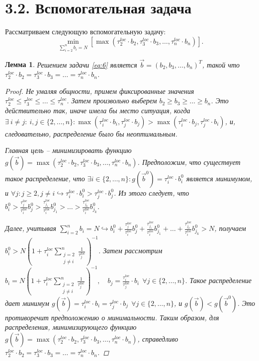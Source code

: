 \documentclass{article}
\theoremstyle{definition}
\theoremstyle{plain}
\newtheorem{lemma}{Лемма}
\begin{document}
\section*{3.2. Вспомогательная задача}
Рассматриваем следующую вспомогательную задачу:
\begin{equation}
    \label{eq:6}
    \underset{\sum\limits_{i = 2}^{n} b_i = N}{\min} [\max(\tau_2^{loc}\cdot b_2, \tau_3^{loc}\cdot b_3, \ldots, \tau_n^{loc}\cdot b_n)].
\end{equation}


\begin{lemma}
    \label{l1}
    Решением задачи \eqref{eq:6} является $\overrightarrow{b} = (b_2, b_3, \ldots, b_n)^{T}$, такой что $\tau_2^{loc}\cdot b_2 = \tau_3^{loc}\cdot b_3 = \ldots = \tau_n^{loc}\cdot b_n$.
    \begin{proof}
        
        Не умаляя общности, примем фиксированные значения $\tau_2^{loc}\leq \tau_3^{loc}\leq \ldots \leq \tau_n^{loc}$.
        Затем произвольно выберем $b_2\geq b_3\geq \ldots \geq b_n$.
        Это действительно так, иначе имела бы место ситуация, когда $\exists ~ i \neq j: ~ i, j\in \{2, \ldots, n\} : \max(\tau_i^{loc}\cdot b_i, \tau_j^{loc}\cdot b_j) > \max(\tau_i^{loc}\cdot b_j, \tau_j^{loc}\cdot b_i)$, и, следовательно, распределение было бы неоптимальным. 
        
        Главная цель -- минимизировать функцию $g(\overrightarrow{b}) = \max(\tau_2^{loc}\cdot b_2, \tau_3^{loc}\cdot b_3, \ldots, \tau_n^{loc}\cdot b_n)$. Предположим, что существует такое распределение, что $\exists i \in \{2, \ldots, n\}: g(\overrightarrow{b}^0) = \tau_i^{loc}\cdot b_i^0$ является минимумом, и $\forall j: j \geq 2, j \neq i \hookrightarrow \tau_i^{loc}\cdot b_i^0 > \tau_j^{loc}\cdot b_j^0$. Из этого следует, что $b_i^0 > \frac{\tau_j^{loc}}{\tau_i^{loc}}b_j^0 > \frac{\tau_{j_1}^{loc}}{\tau_i^{loc}}b_{j_1}^0 > \ldots > \frac{\tau_{j_k}^{loc}}{\tau_i^{loc}}b_{j_k}^0$. 
        
        Далее, учитывая $\sum\limits_{i = 2}^n b_i = N \hookrightarrow b_i^0 + \frac{\tau_j^{loc}}{\tau_i^{loc}}b_j^0 + \frac{\tau_{j_1}^{loc}}{\tau_i^{loc}}b_{j_1}^0 + \ldots + \frac{\tau_{j_k}^{loc}}{\tau_i^{loc}}b_{j_k}^0 > N$,
        получаем $b_i^0 > N(1 + \tau_i^{loc}\sum\limits_{\substack{j = 2 \\ j \neq i}}^n \frac{1}{\tau_j^{loc}})^{-1}$. Затем рассмотрим $b_i = N(1 + \tau_i^{loc}\sum\limits_{\substack{j = 2 \\ j \neq i}}^n \frac{1}{\tau_j^{loc}})^{-1}, \quad b_j = \frac {\tau_i^{loc}}{\tau_j^{loc}}\cdot b_i  ~~ \forall j \in \{2,\ldots,n\}$. Такое распределение дает минимум $g(\overrightarrow{b}) = \tau_i^{loc}\cdot b_i = \tau_j^{loc}\cdot b_j ~~ \forall j \in \{2,\ldots,n\}$, и $g(\overrightarrow{b}) < g(\overrightarrow{b}^0)$. Это противоречит предположению о минимальности. Таким образом, для распределения, минимизирующего функцию $g(\overrightarrow{b}) = \max(\tau_2^{loc}\cdot b_2, \tau_3^{loc}\cdot b_3, \ldots, \tau_n^{loc}\cdot b_n)$, справедливо $\tau_2^{loc}\cdot b_2 = \tau_3^{loc}\cdot b_3 = \ldots = \tau_n^{loc}\cdot b_n$.
    \end{proof}
\end{lemma}
\end{document}
